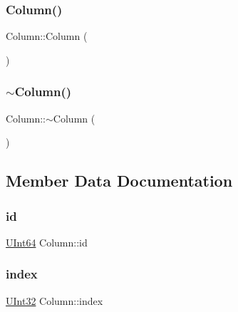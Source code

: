 \subsubsection{\texorpdfstring{Column()}{Column()}}
{\footnotesize\ttfamily Column\+::\+Column (\begin{DoxyParamCaption}{ }\end{DoxyParamCaption})\hspace{0.3cm}{\ttfamily [inline]}}

\mbox{\label{classColumn_aa6d1865b2d7d1bce58ca38f17bc368cd}} 
\subsubsection{\texorpdfstring{$\sim$\+Column()}{~Column()}}
{\footnotesize\ttfamily Column\+::$\sim$\+Column (\begin{DoxyParamCaption}{ }\end{DoxyParamCaption})\hspace{0.3cm}{\ttfamily [inline]}}



\subsection{Member Data Documentation}
\mbox{\label{classColumn_a2d6c19ce93044895d4f996d235926dde}} 
\subsubsection{\texorpdfstring{id}{id}}
{\footnotesize\ttfamily \hyperlink{global_8h_aa288382a207683aa38aca516f6edd66d}{U\+Int64} Column\+::id}

\mbox{\label{classColumn_a40897c4f55d38214aef281b873b9e982}} 
\subsubsection{\texorpdfstring{index}{index}}
{\footnotesize\ttfamily \hyperlink{global_8h_a7e8aeec7b6541935dfc6f608cd5170ce}{U\+Int32} Column\+::index}

\mbox{\label{classColumn_abb47c8d92b4fd7a6c12f4a71b4b4dfef}} 
